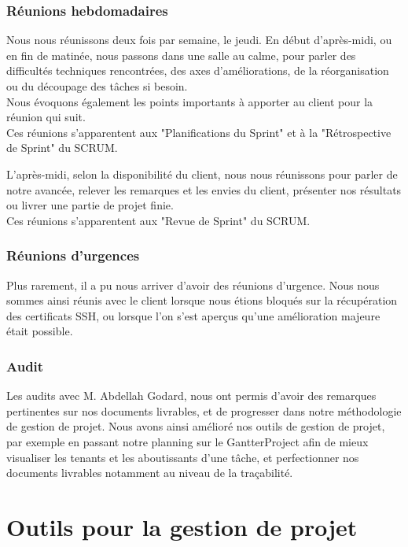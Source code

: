 \subsubsection{Réunions hebdomadaires}

Nous nous réunissons deux fois par semaine, le jeudi.
En début d'après-midi, ou en fin de matinée, nous passons dans une salle au calme, pour parler des difficultés techniques rencontrées, des axes d'améliorations, de la réorganisation ou du découpage des tâches si besoin.\\
Nous évoquons également les points importants à apporter au client pour la réunion qui suit.\\
Ces réunions s'apparentent aux "Planifications du Sprint" et à la "Rétrospective de Sprint" du SCRUM.

L'après-midi, selon la disponibilité du client, nous nous réunissons pour parler de notre avancée, relever les remarques et les envies du client, présenter nos résultats ou livrer une partie de projet finie.\\
Ces réunions s'apparentent aux "Revue de Sprint" du SCRUM.

\subsubsection{Réunions d'urgences}

Plus rarement, il a pu nous arriver d'avoir des réunions d'urgence. Nous nous sommes ainsi réunis avec le client lorsque nous étions bloqués sur la récupération des certificats SSH, ou lorsque l'on s'est aperçus qu'une amélioration majeure était possible.

\subsubsection{Audit}

Les audits avec M. Abdellah Godard, nous ont permis d'avoir des remarques pertinentes sur nos documents livrables, et de progresser dans notre méthodologie de gestion de projet. Nous avons ainsi amélioré nos outils de gestion de projet, par exemple en passant notre planning sur le GantterProject afin de mieux visualiser les tenants et les aboutissants d'une tâche, et perfectionner nos documents livrables notamment au niveau de la traçabilité.

\section{Outils pour la gestion de projet}

